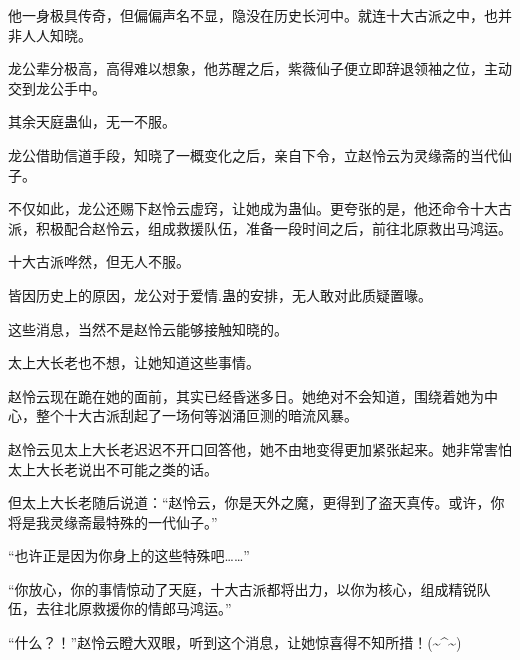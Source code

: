 \begin{this_body}
他一身极具传奇，但偏偏声名不显，隐没在历史长河中。就连十大古派之中，也并非人人知晓。

龙公辈分极高，高得难以想象，他苏醒之后，紫薇仙子便立即辞退领袖之位，主动交到龙公手中。

其余天庭蛊仙，无一不服。

龙公借助信道手段，知晓了一概变化之后，亲自下令，立赵怜云为灵缘斋的当代仙子。

不仅如此，龙公还赐下赵怜云虚窍，让她成为蛊仙。更夸张的是，他还命令十大古派，积极配合赵怜云，组成救援队伍，准备一段时间之后，前往北原救出马鸿运。

十大古派哗然，但无人不服。

皆因历史上的原因，龙公对于爱情.蛊的安排，无人敢对此质疑置喙。

这些消息，当然不是赵怜云能够接触知晓的。

太上大长老也不想，让她知道这些事情。

赵怜云现在跪在她的面前，其实已经昏迷多日。她绝对不会知道，围绕着她为中心，整个十大古派刮起了一场何等汹涌叵测的暗流风暴。

赵怜云见太上大长老迟迟不开口回答他，她不由地变得更加紧张起来。她非常害怕太上大长老说出不可能之类的话。

但太上大长老随后说道：“赵怜云，你是天外之魔，更得到了盗天真传。或许，你将是我灵缘斋最特殊的一代仙子。”

“也许正是因为你身上的这些特殊吧……”

“你放心，你的事情惊动了天庭，十大古派都将出力，以你为核心，组成精锐队伍，去往北原救援你的情郎马鸿运。”

“什么？！”赵怜云瞪大双眼，听到这个消息，让她惊喜得不知所措！(\~{}\^{}\~{})

\end{this_body}

